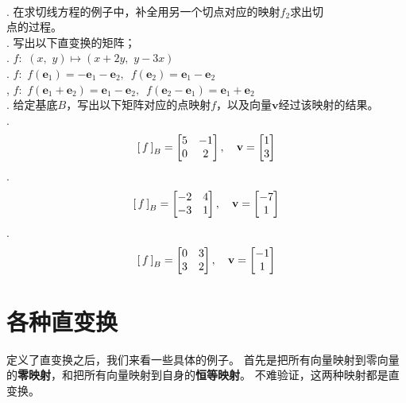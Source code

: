 \documentclass[12pt,UTF8]{ctexbook}
\begin{document}
\begin{xt}
    \mbox{} \\
    . 在求切线方程的例子中，补全用另一个切点对应的映射$f_2$求出切 \\
    \indent 点的过程。\\
    . 写出以下直变换的矩阵；\\
    . $f: \,\, (x,\,\, y) \mapsto (x + 2y,\,\, y - 3x)$ \\
    . $f: \,\, f(\mathbf{e}_1) = -\mathbf{e}_1 - \mathbf{e}_2,\,\,\, f(\mathbf{e}_2) = \mathbf{e}_1 - \mathbf{e}_2$ \\
    , $f: \,\, f(\mathbf{e}_1 + \mathbf{e}_2) = \mathbf{e}_1 - \mathbf{e}_2,\,\,\, f(\mathbf{e}_2 - \mathbf{e}_1) = \mathbf{e}_1 + \mathbf{e}_2$ \\
    . 给定基底$B$，写出以下矩阵对应的点映射$f$，以及向量$\mathbf{v}$经过该映射的结果。\\
    . $$
                \bmat{f}[B] = 
                \begin{bmatrix}
                    5 & -1 \\ 0 & 2
                \end{bmatrix},\quad \mathbf{v} = \begin{bmatrix}
                    1\\ 3
                \end{bmatrix}
                $$
    . $$
                \bmat{f}[B] = 
                \begin{bmatrix}
                    -2 & 4 \\ -3 & 1
                \end{bmatrix},\quad \mathbf{v} = \begin{bmatrix}
                    -7\\ 1
                \end{bmatrix}
                $$
    . $$
                \bmat{f}[B] = 
                \begin{bmatrix}
                    0 & 3 \\ 3 & 2
                \end{bmatrix},\quad \mathbf{v} = \begin{bmatrix}
                    -1\\ 1
                \end{bmatrix}
                $$
\end{xt}

\section{各种直变换}
定义了直变换之后，我们来看一些具体的例子。
首先是把所有向量映射到零向量的\textbf{零映射}，和把所有向量映射到自身的\textbf{恒等映射}。
不难验证，这两种映射都是直变换。
\end{document}
